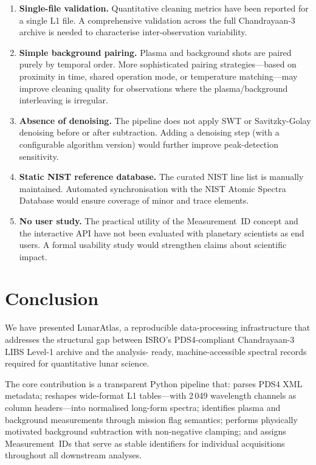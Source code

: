 \documentclass[a4paper,twocolumn,10pt]{article}
\begin{document}
\begin{enumerate}[nosep,leftmargin=*]
  \item \textbf{Single-file validation.}  Quantitative cleaning
    metrics have been reported for a single L1 file.  A comprehensive
    validation across the full Chandrayaan-3 archive is needed to
    characterise inter-observation variability.

  \item \textbf{Simple background pairing.}  Plasma and background
    shots are paired purely by temporal order.  More sophisticated
    pairing strategies---based on proximity in time, shared operation
    mode, or temperature matching---may improve cleaning quality
    for observations where the plasma/background interleaving
    is irregular.

  \item \textbf{Absence of denoising.}  The pipeline does not apply
    SWT or Savitzky-Golay denoising before or after subtraction.
    Adding a denoising step (with a configurable algorithm version)
    would further improve peak-detection sensitivity.

  \item \textbf{Static NIST reference database.}  The curated NIST
    line list is manually maintained.  Automated synchronisation with
    the NIST Atomic Spectra Database would ensure coverage of minor
    and trace elements.

  \item \textbf{No user study.}  The practical utility of the
    Measurement~ID concept and the interactive API have not been
    evaluated with planetary scientists as end users.  A formal
    usability study would strengthen claims about scientific impact.
\end{enumerate}


\section{Conclusion}
\label{sec:conclusion}

We have presented LunarAtlas, a reproducible data-processing
infrastructure that addresses the structural gap between ISRO's
PDS4-compliant Chandrayaan-3 LIBS Level-1 archive and the analysis-
ready, machine-accessible spectral records required for quantitative
lunar science.

The core contribution is a transparent Python pipeline that: parses
PDS4 XML metadata; reshapes wide-format L1 tables---with 2\,049
wavelength channels as column headers---into normalised long-form
spectra; identifies plasma and background measurements through mission
flag semantics; performs physically motivated background subtraction
with non-negative clamping; and assigns Measurement~IDs that serve as
stable identifiers for individual acquisitions throughout all
downstream analyses.
\end{document}
